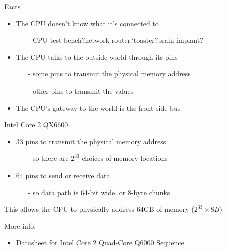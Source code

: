 \begin{frame}%
  \begin{block}{Facts}
    \begin{itemize}
    \item The CPU doesn't know what it's connected to
      \begin{itemize}
      \item[-] CPU test bench?\quad{}network router?\quad{}toaster?\quad{}brain implant?
      \end{itemize}
    \item The CPU talks to the outside world through its pins
      \begin{itemize}
      \item[-] some pins to transmit the physical memory address
      \item[-] other pins to transmit the values
      \end{itemize}
    \item The CPU's gateway to the world is the front-side bus
    \end{itemize}
  \end{block}
  \begin{block}{Intel Core 2 QX6600}
    \begin{itemize}
    \item 33 pins to transmit the physical memory address
      \begin{itemize}
      \item[-] so there are $2^{33}$ choices of memory locations
      \end{itemize}
    \item 64 pins to send or receive data
      \begin{itemize}
      \item[-] so data path is 64-bit wide, or 8-byte chunks
      \end{itemize}
    \end{itemize}
    This allows the CPU to physically address 64GB of memory ($2^{33}\times{}8B$)
  \end{block}
\end{frame}

More info:
\begin{itemize}
\item \href{http://download.intel.com/design/processor/datashts/31559205.pdf}{Datasheet for Intel Core 2 Quad-Core Q6000 Sequence}
\end{itemize}

